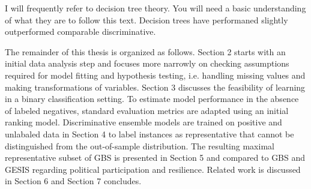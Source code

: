 I will frequently refer to decision tree theory. You will need a basic understanding of what they are to follow this text. Decision trees have performaned slightly outperformed comparable discriminative.

The remainder of this thesis is organized as follows. Section 2 starts with an initial data analysis step and focuses more narrowly on checking assumptions required for model fitting and hypothesis testing, i.e. handling missing values and making transformations of variables. Section 3 discusses the feasibility of learning in a binary classification setting. To estimate model performance in the absence of labeled negatives, standard evaluation metrics are adapted using an initial ranking model. Discriminative ensemble models are trained on positive and unlabaled data in Section 4 to label instances as representative that cannot be distinguished from the out-of-sample distribution. The resulting maximal representative subset of GBS is presented in Section 5 and compared to GBS and GESIS regarding political participation and resilience. Related work is discussed in Section 6 and Section 7 concludes.
